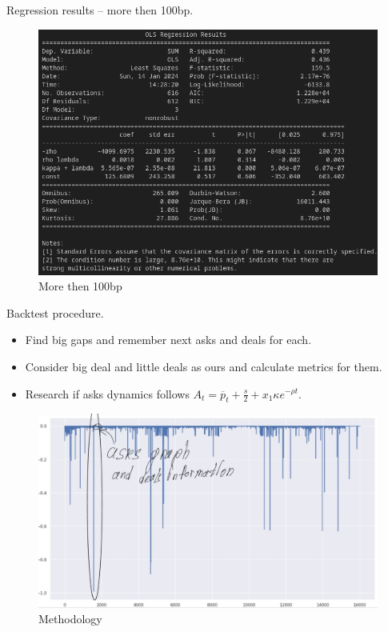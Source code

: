 \documentclass[aspectratio=169]{beamer}
\begin{document}
\begin{frame}{Regression results -- more then 100bp.}
    \begin{figure}
        \includegraphics[scale=0.49]{figs/Reg100bp.png}
        \caption{More then 100bp}
        \label{fig:mvslim}
    \end{figure}
\end{frame}

\begin{frame}{Backtest procedure.}
    \begin{itemize}
        \item Find big gaps and remember next asks and deals for each.
        \item Consider big deal and little deals as ours and calculate metrics for them.
        \item Research if asks dynamics follows $A_t = \overline p _t + \frac{s}{2} + x_1 \kappa e^{- \rho t}$.
    \end{itemize}
    \begin{figure}
        \includegraphics[scale=0.22]{figs/bt_met.jpg}
        \caption{Methodology}
        \label{fig:mvslim}
    \end{figure}
\end{frame}
\end{document}
